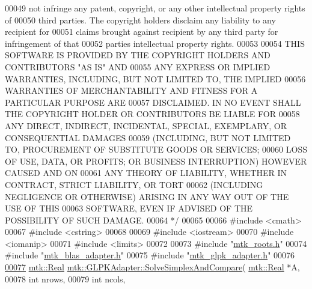 \begin{DoxyCode}
00049 \textcolor{comment}{not infringe any patent, copyright, or any other intellectual property rights of}
00050 \textcolor{comment}{third parties. The copyright holders disclaim any liability to any recipient for}
00051 \textcolor{comment}{claims brought against recipient by any third party for infringement of that}
00052 \textcolor{comment}{parties intellectual property rights.}
00053 \textcolor{comment}{}
00054 \textcolor{comment}{THIS SOFTWARE IS PROVIDED BY THE COPYRIGHT HOLDERS AND CONTRIBUTORS "AS IS" AND}
00055 \textcolor{comment}{ANY EXPRESS OR IMPLIED WARRANTIES, INCLUDING, BUT NOT LIMITED TO, THE IMPLIED}
00056 \textcolor{comment}{WARRANTIES OF MERCHANTABILITY AND FITNESS FOR A PARTICULAR PURPOSE ARE}
00057 \textcolor{comment}{DISCLAIMED. IN NO EVENT SHALL THE COPYRIGHT HOLDER OR CONTRIBUTORS BE LIABLE FOR}
00058 \textcolor{comment}{ANY DIRECT, INDIRECT, INCIDENTAL, SPECIAL, EXEMPLARY, OR CONSEQUENTIAL DAMAGES}
00059 \textcolor{comment}{(INCLUDING, BUT NOT LIMITED TO, PROCUREMENT OF SUBSTITUTE GOODS OR SERVICES;}
00060 \textcolor{comment}{LOSS OF USE, DATA, OR PROFITS; OR BUSINESS INTERRUPTION) HOWEVER CAUSED AND ON}
00061 \textcolor{comment}{ANY THEORY OF LIABILITY, WHETHER IN CONTRACT, STRICT LIABILITY, OR TORT}
00062 \textcolor{comment}{(INCLUDING NEGLIGENCE OR OTHERWISE) ARISING IN ANY WAY OUT OF THE USE OF THIS}
00063 \textcolor{comment}{SOFTWARE, EVEN IF ADVISED OF THE POSSIBILITY OF SUCH DAMAGE.}
00064 \textcolor{comment}{*/}
00065 
00066 \textcolor{preprocessor}{#include <cmath>}
00067 \textcolor{preprocessor}{#include <cstring>}
00068 
00069 \textcolor{preprocessor}{#include <iostream>}
00070 \textcolor{preprocessor}{#include <iomanip>}
00071 \textcolor{preprocessor}{#include <limits>}
00072 
00073 \textcolor{preprocessor}{#include "\hyperlink{mtk__roots_8h}{mtk\_roots.h}"}
00074 \textcolor{preprocessor}{#include "\hyperlink{mtk__blas__adapter_8h}{mtk\_blas\_adapter.h}"}
00075 \textcolor{preprocessor}{#include "\hyperlink{mtk__glpk__adapter_8h}{mtk\_glpk\_adapter.h}"}
00076 
\hypertarget{mtk__glpk__adapter_8cc_source_l00077}{}\hyperlink{classmtk_1_1GLPKAdapter_a834480aca83e3c0d09fdab7fdb7e8a3f}{00077} \hyperlink{group__c01-roots_gac080bbbf5cbb5502c9f00405f894857d}{mtk::Real} \hyperlink{classmtk_1_1GLPKAdapter_a834480aca83e3c0d09fdab7fdb7e8a3f}{mtk::GLPKAdapter::SolveSimplexAndCompare}(
      \hyperlink{group__c01-roots_gac080bbbf5cbb5502c9f00405f894857d}{mtk::Real} *A,
00078                                                    \textcolor{keywordtype}{int} nrows,
00079                                                    \textcolor{keywordtype}{int} ncols,

\end{DoxyCode}
